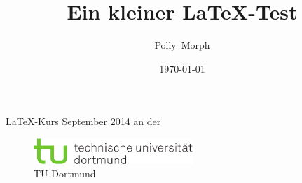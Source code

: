 \documentclass{book}
\begin{document}
\title{Ein kleiner \LaTeX-Test}
\author{Polly~Morph}
\date{\today}

\maketitle

\tableofcontents




\newpage
\LaTeX-Kurs September 2014 an der
\begin{figure}[h!]
	\includegraphics[width=6cm]{exercise8/tud.pdf}
	\caption{TU Dortmund}
\end{figure}
\end{document}
